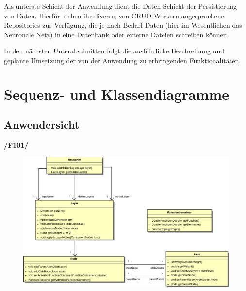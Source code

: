 Als unterste Schicht der Anwendung dient die Daten-Schicht der Persistierung von Daten. Hierfür stehen ihr diverse, von CRUD-Workern angesprochene Repositories zur Verfügung, die je nach Bedarf Daten (hier im Wesentlichen das Neuronale Netz) in eine Datenbank oder externe Dateien schreiben können.

In den nächsten Unterabschnitten folgt die ausführliche Beschreibung und geplante Umsetzung der von der Anwendung zu erbringenden Funktionalitäten.  

\section{Sequenz- und Klassendiagramme}
\subsection{Anwendersicht}

\textbf{/F101/}

\begin{figure}[h]
\begin{center}
\includegraphics[width=\textwidth]{Abbildungen/UML/uml_ronny/neuralNetKlassenDiagramm.png}
\end{center}
\end{figure}


